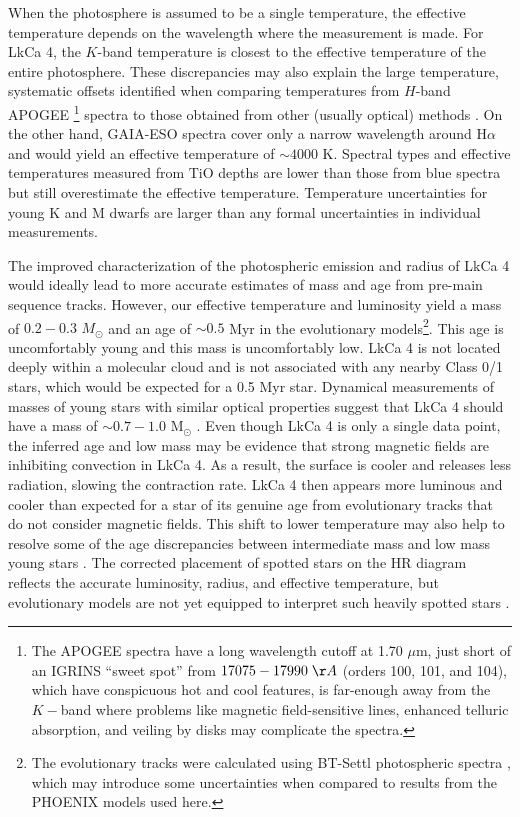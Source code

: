 \documentclass[twocolumn]{emulateapj}%
\begin{document}
When the photosphere is assumed to be a single temperature, the effective temperature depends on the wavelength where the measurement is made.  For LkCa 4, the $K$-band temperature  is closest to the effective temperature of the entire photosphere.  These discrepancies may also explain the large temperature, systematic offsets identified when comparing temperatures from $H$-band APOGEE \footnote{The APOGEE spectra have a long wavelength cutoff at 1.70 $\mu$m, just short of an IGRINS ``sweet spot'' from $17075-17990 \;\AA$ (orders 100, 101, and 104), which have conspicuous hot and cool features, is far-enough away from the $K-$band where problems like magnetic field-sensitive lines, enhanced telluric absorption, and veiling by disks may complicate the spectra.} spectra to those obtained from other (usually optical) methods \citep{cottaar14}. 
On the other hand, GAIA-ESO spectra \citep{frasca15} cover only a narrow wavelength around H$\alpha$ and would yield an effective temperature of $\sim 4000$ K.   Spectral types and effective temperatures measured from TiO depths \citep{herczeg14} are lower than those from blue spectra but still overestimate the effective temperature.  Temperature uncertainties for young K and M dwarfs are larger than any formal uncertainties in individual measurements.

The improved characterization of the photospheric emission and radius of LkCa 4 would ideally lead to more accurate estimates of mass and age from pre-main sequence tracks.  However, our effective temperature and luminosity yield a mass of $0.2-0.3$ $M_\odot$ and an age of $\sim 0.5$ Myr in the \citet{baraffe15} evolutionary models\footnote{The \citet{baraffe15} evolutionary tracks were calculated using BT-Settl photospheric spectra \citep{allard14}, which may introduce some uncertainties when compared to results from the PHOENIX models used here.}.  This age is uncomfortably young and this mass is uncomfortably low.  LkCa 4 is not located deeply within a molecular cloud and is not associated with any nearby Class 0/1 stars, which would be expected for a 0.5 Myr star.  Dynamical measurements of masses of young stars with similar optical properties suggest that LkCa 4 should have a mass of $\sim 0.7-1.0$ M$_\odot$ \citep[e.g.][]{guilloteau14,czekala16,rizzuto16}.  Even though LkCa 4 is only a single data point, the inferred age and low mass may be evidence that strong magnetic fields are inhibiting convection in LkCa 4.  As a result, the surface is cooler and releases less radiation, slowing the contraction rate.  LkCa 4 then appears more luminous and cooler than expected for a star of its genuine age from evolutionary tracks that do not consider magnetic fields.   This shift to lower temperature may also help to resolve some of the age discrepancies between intermediate mass and low mass young stars \citep[e.g.][]{herczeg15}.  The corrected placement of spotted stars on the HR diagram reflects the accurate luminosity, radius, and effective temperature, but evolutionary models are not yet equipped to interpret such heavily spotted stars \citep{somers15}.
\end{document}
